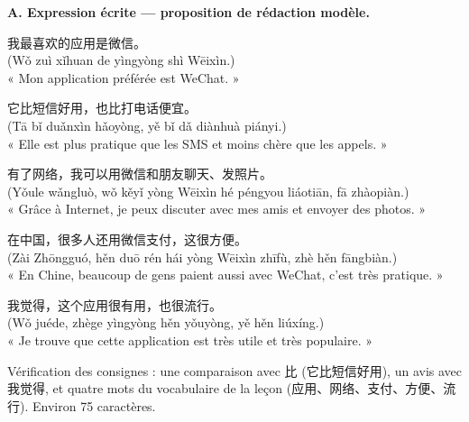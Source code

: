 \documentclass[11pt]{article}
\begin{document}
\begin{corrige}
\textbf{A. Expression écrite — proposition de rédaction modèle.}

我最喜欢的应用是微信。\\
(Wǒ zuì xǐhuan de yìngyòng shì Wēixìn.)\\
« Mon application préférée est WeChat. »

它比短信好用，也比打电话便宜。\\
(Tā bǐ duǎnxìn hǎoyòng, yě bǐ dǎ diànhuà piányi.)\\
« Elle est plus pratique que les SMS et moins chère que les appels. »

有了网络，我可以用微信和朋友聊天、发照片。\\
(Yǒule wǎngluò, wǒ kěyǐ yòng Wēixìn hé péngyou liáotiān, fā zhàopiàn.)\\
« Grâce à Internet, je peux discuter avec mes amis et envoyer des photos. »

在中国，很多人还用微信支付，这很方便。\\
(Zài Zhōngguó, hěn duō rén hái yòng Wēixìn zhīfù, zhè hěn fāngbiàn.)\\
« En Chine, beaucoup de gens paient aussi avec WeChat, c'est très pratique. »

我觉得，这个应用很有用，也很流行。\\
(Wǒ juéde, zhège yìngyòng hěn yǒuyòng, yě hěn liúxíng.)\\
« Je trouve que cette application est très utile et très populaire. »

Vérification des consignes : une comparaison avec 比 (它比短信好用), un avis avec 我觉得, et quatre mots du vocabulaire de la leçon (应用、网络、支付、方便、流行). Environ 75 caractères.


\end{corrige}
\end{document}
